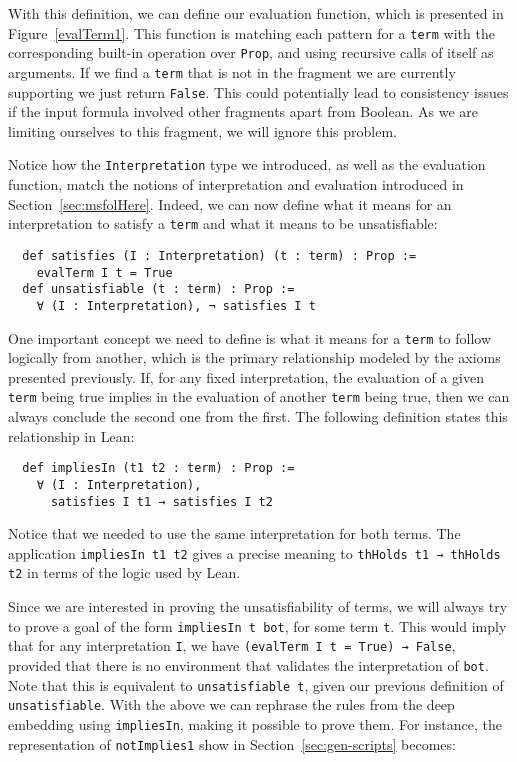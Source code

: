 With this definition, we can define our evaluation function, which is presented in
Figure~\ref{evalTerm1}.
This function is matching each pattern for a \texttt{term} with the corresponding built-in operation over \texttt{Prop}, and using recursive calls of itself as arguments. If we find a \texttt{term} that is not in the fragment we are currently supporting we just return \texttt{False}. This could potentially lead to consistency issues if the input formula involved other fragments apart from Boolean. As we are limiting ourselves to this fragment, we will ignore this problem.

Notice how the \texttt{Interpretation} type we introduced, as well as the evaluation function, match the notions of interpretation and evaluation introduced in Section~\ref{sec:msfolHere}. Indeed, we can now define what it means for an interpretation to satisfy a \texttt{term} and what it means to be unsatisfiable:

\begin{verbatim}
  def satisfies (I : Interpretation) (t : term) : Prop :=
    evalTerm I t = True
  def unsatisfiable (t : term) : Prop :=
    ∀ (I : Interpretation), ¬ satisfies I t
\end{verbatim}

One important concept we need to define is what it means for a \texttt{term}
to follow logically from another, which is the primary relationship modeled
by the axioms presented previously.
%
If, for any fixed interpretation, the evaluation of a given \texttt{term} being true
implies in the evaluation of another \texttt{term} being true, then we can always
conclude the second one from the first. The following definition states this
relationship in Lean:

\begin{verbatim}
  def impliesIn (t1 t2 : term) : Prop :=
    ∀ (I : Interpretation),
      satisfies I t1 → satisfies I t2
\end{verbatim}

Notice that we needed to use the same interpretation for both terms.
%
The application \texttt{impliesIn t1 t2} gives a precise meaning to \texttt{thHolds t1 → thHolds t2} in terms of the logic used by Lean.

Since we are interested in proving the unsatisfiability of terms, we will always try to prove a goal of the form \texttt{impliesIn t bot}, for some term \texttt{t}. This would imply that for any interpretation \texttt{I}, we have \texttt{(evalTerm I t = True) → False}, provided that there is no environment that validates the interpretation of \texttt{bot}. Note that this is equivalent to \texttt{unsatisfiable t}, given our previous definition of \texttt{unsatisfiable}.
With the above we can rephrase the rules from the deep embedding using
\texttt{impliesIn}, making it possible to prove them.
%
For instance, the representation of \texttt{notImplies1} show in Section~\ref{sec:gen-scripts} becomes:

